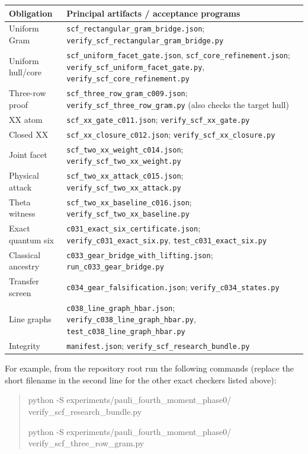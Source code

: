 \documentclass[11pt,a4paper]{article}
\theoremstyle{remark}\newtheorem{remark}[theorem]{Remark}
\newcommand{\artifact}[1]{\nolinkurl{#1}}
\begin{document}
\small
\begin{longtable}{p{.19\linewidth}>{\raggedright\arraybackslash}p{.73\linewidth}}
\toprule Obligation & Principal artifacts / acceptance programs\\\midrule
\endhead
Uniform Gram & \artifact{scf_rectangular_gram_bridge.json};
 \artifact{verify_scf_rectangular_gram_bridge.py}\\
Uniform hull/core & \artifact{scf_uniform_facet_gate.json},
 \artifact{scf_core_refinement.json};
 \artifact{verify_scf_uniform_facet_gate.py},
 \artifact{verify_scf_core_refinement.py}\\
Three-row proof & \artifact{scf_three_row_gram_c009.json};
 \artifact{verify_scf_three_row_gram.py} (also checks the target hull)\\
XX atom & \artifact{scf_xx_gate_c011.json};
 \artifact{verify_scf_xx_gate.py}\\
Closed XX & \artifact{scf_xx_closure_c012.json};
 \artifact{verify_scf_xx_closure.py}\\
Joint facet & \artifact{scf_two_xx_weight_c014.json};
 \artifact{verify_scf_two_xx_weight.py}\\
Physical attack & \artifact{scf_two_xx_attack_c015.json};
 \artifact{verify_scf_two_xx_attack.py}\\
Theta witness & \artifact{scf_two_xx_baseline_c016.json};
 \artifact{verify_scf_two_xx_baseline.py}\\
Exact quantum six & \artifact{c031_exact_six_certificate.json};
 \artifact{verify_c031_exact_six.py}, \artifact{test_c031_exact_six.py}\\
Classical ancestry & \artifact{c033_gear_bridge_with_lifting.json};
 \artifact{run_c033_gear_bridge.py}\\
Transfer screen & \artifact{c034_gear_falsification.json};
 \artifact{verify_c034_states.py}\\
Line graphs & \artifact{c038_line_graph_hbar.json};
 \artifact{verify_c038_line_graph_hbar.py},
 \artifact{test_c038_line_graph_hbar.py}\\
Integrity & \artifact{manifest.json};
 \artifact{verify_scf_research_bundle.py}\\\bottomrule
\end{longtable}
\normalsize
For example, from the repository root run the following commands
(replace the short filename in the second line for the other exact
checkers listed above):
\begin{quote}\small\ttfamily
python -S experiments/pauli\_fourth\_moment\_phase0/\\
\hspace*{1em}verify\_scf\_research\_bundle.py\par
python -S experiments/pauli\_fourth\_moment\_phase0/\\
\hspace*{1em}verify\_scf\_three\_row\_gram.py
\end{quote}
\end{document}
